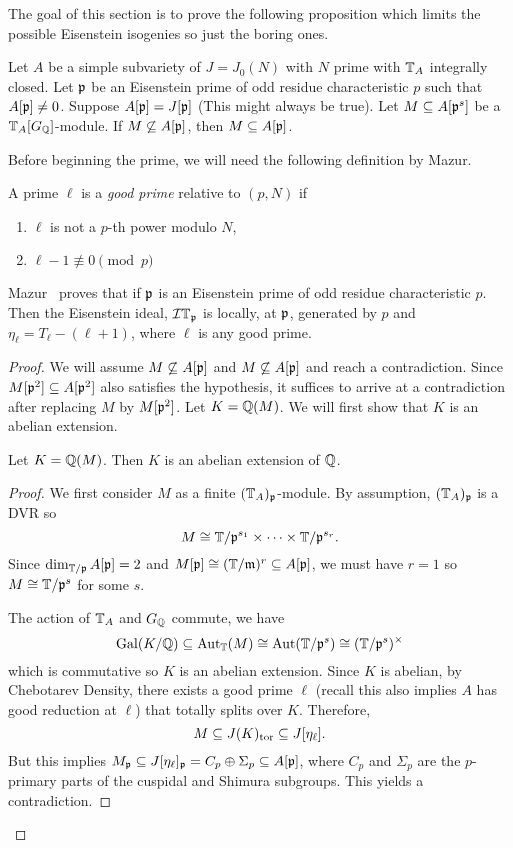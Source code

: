 The goal of this section is to prove the following proposition which limits the
possible Eisenstein isogenies so just the boring ones.
\begin{proposition}
    Let $A$ be a simple subvariety of $J=J_0(N)$ with $N$ prime with $\mathbb{T}_A$
    integrally closed. Let $\mathfrak{p}$ be an Eisenstein prime of odd residue
    characteristic $p$ such that $A[\mathfrak{p}]\neq 0$. Suppose $A[\mathfrak{p}]=J[\mathfrak{p}]$ (This
    might always be true). Let $M\subseteq A[\mathfrak{p}^s]$ be a $\mathbb{T}_A[G_{\mathbb{Q}}]$-module.
    If $M \not\subseteq A[\mathfrak{p}]$, then $M\subseteq A[\mathfrak{p}]$.
\end{proposition}
Before beginning the prime, we will need the following definition by Mazur.
\begin{definition}
    A prime $\ell$ is a \emph{good prime} relative to $(p, N)$ if 
    \begin{enumerate}
        \item
            $\ell$ is not a $p$-th power modulo $N$,
        \item
            $\ell-1\not\equiv 0 \pmod{p}$
    \end{enumerate}
\end{definition}
Mazur~\cite[Prop 16.1]{mazur:eisenstein} proves that if $\mathfrak{p}$ is an Eisenstein
prime of odd residue characteristic $p$. Then the Eisenstein ideal, $\mathcal{I} \mathbb{T}_{\mathfrak{p}}$
is locally, at $\mathfrak{p}$, generated by $p$ and $\eta_\ell = T_\ell - (\ell+1)$,
where $\ell$ is any good prime.

\begin{proof}
    We will assume $M\not\subseteq A[\mathfrak{p}]$ and $M\not\subseteq A[\mathfrak{p}]$ and reach
    a contradiction. Since $M[\mathfrak{p}^2]\subseteq A[\mathfrak{p}^2]$ also satisfies the
    hypothesis, it suffices to arrive at a contradiction after replacing $M$ by
    $M[\mathfrak{p}^2]$. Let $K = \mathbb{Q}(M)$. We will first show that $K$ is an abelian
    extension.
    \begin{lemma}
        Let $K=\mathbb{Q}(M)$. Then $K$ is an abelian extension of $\mathbb{Q}$.
    \end{lemma}
    \begin{proof}
        We first consider $M$ as a finite $(\mathbb{T}_A)_{\mathfrak{p}}$-module. By assumption,
        $(\mathbb{T}_A)_{\mathfrak{p}}$ is a DVR so
        \[
            M \cong \mathbb{T}/\mathfrak{p}^{s_1}\times \cdots\times \mathbb{T}/\mathfrak{p}^{s_r}.
        \]
        Since $\dim_{\mathbb{T}/\mathfrak{p}} A[\mathfrak{p}] = 2$ and $M[\mathfrak{p}]\cong (\mathbb{T}/\mathfrak{m})^r\subseteq
        A[\mathfrak{p}]$, we must have $r=1$ so $M\cong \mathbb{T}/\mathfrak{p}^s$ for some $s$.

        The action of $\mathbb{T}_A$ and $G_{\mathbb{Q}}$ commute, we have
        \[
            \operatorname{Gal}(K/\mathbb{Q})\subseteq \operatorname{Aut}_{\mathbb{T}}(M)\cong \operatorname{Aut}(\mathbb{T}/\mathfrak{p}^s) \cong
            (\mathbb{T}/\mathfrak{p}^s)^\times
        \]
        which is commutative so $K$ is an abelian extension. Since $K$ is
        abelian, by Chebotarev Density, there exists a good prime $\ell$
        (recall this also implies $A$ has good reduction at $\ell$) that
        totally splits over $K$. Therefore,
        \[
            M \subseteq J(K)_{\mathrm{tor}} \subseteq J[\eta_\ell].
        \]
        But this implies $M_{\mathfrak{p}}\subseteq J[\eta_\ell]_{\mathfrak{p}} = C_p \oplus
        \Sigma_p\subseteq A[\mathfrak{p}]$, where $C_p$ and $\Sigma_p$ are the
        $p$-primary parts of the cuspidal and Shimura subgroups. This yields
        a contradiction.
    \end{proof}
\end{proof}
